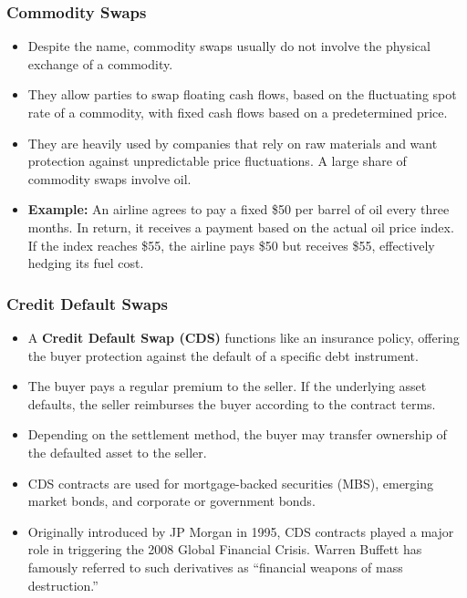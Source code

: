\documentclass[12pt,openany]{book}
\begin{document}
\subsubsection{Commodity Swaps}

\begin{itemize}[leftmargin=*]
    \item Despite the name, commodity swaps usually do not involve the physical exchange of a commodity.
    \item They allow parties to swap floating cash flows, based on the fluctuating spot rate of a commodity, with fixed cash flows based on a predetermined price.
    \item They are heavily used by companies that rely on raw materials and want protection against unpredictable price fluctuations. A large share of commodity swaps involve oil.
    \item \textbf{Example:} An airline agrees to pay a fixed \$50 per barrel of oil every three months. In return, it receives a payment based on the actual oil price index. If the index reaches \$55, the airline pays \$50 but receives \$55, effectively hedging its fuel cost.
\end{itemize}

\subsubsection{Credit Default Swaps}

\begin{itemize}[leftmargin=*]
    \item A \textbf{Credit Default Swap (CDS)} functions like an insurance policy, offering the buyer protection against the default of a specific debt instrument.
    \item The buyer pays a regular premium to the seller. If the underlying asset defaults, the seller reimburses the buyer according to the contract terms.
    \item Depending on the settlement method, the buyer may transfer ownership of the defaulted asset to the seller.
    \item CDS contracts are used for mortgage-backed securities (MBS), emerging market bonds, and corporate or government bonds.
    \item Originally introduced by JP Morgan in 1995, CDS contracts played a major role in triggering the 2008 Global Financial Crisis. Warren Buffett has famously referred to such derivatives as ``financial weapons of mass destruction.''
\end{itemize}
\end{document}
